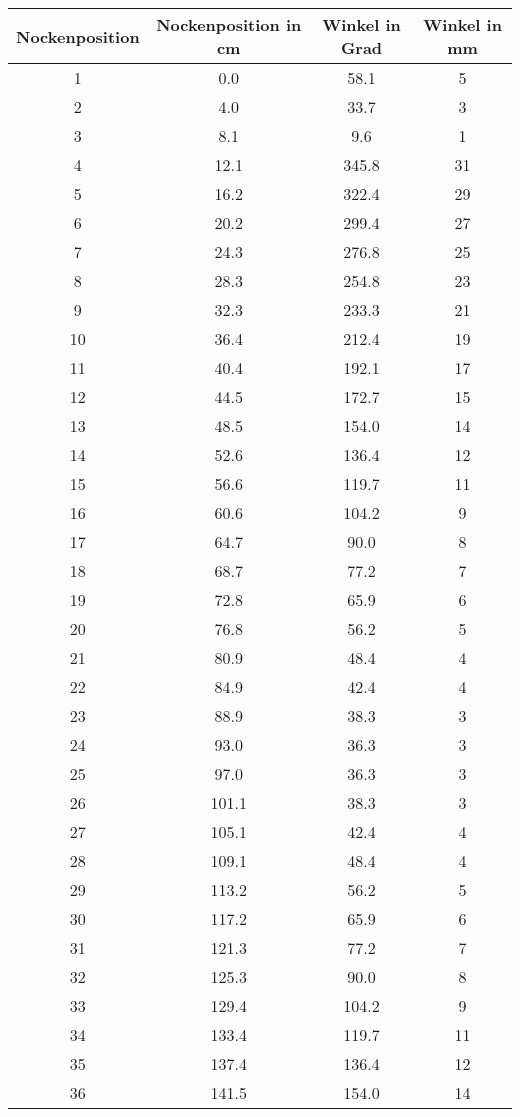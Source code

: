 \documentclass[10pt, a4paper]{article}
\begin{document}
\begin{center}
	\begin{tabular}{c|c|c|c}
		Nockenposition & Nockenposition in cm & Winkel in Grad & Winkel in mm \\
		\hline
		1 & 0.0 & 58.1 & 5 \\
		2 & 4.0 & 33.7 & 3 \\
		3 & 8.1 & 9.6 & 1 \\
		4 & 12.1 & 345.8 & 31 \\
		5 & 16.2 & 322.4 & 29 \\
		6 & 20.2 & 299.4 & 27 \\
		7 & 24.3 & 276.8 & 25 \\
		8 & 28.3 & 254.8 & 23 \\
		9 & 32.3 & 233.3 & 21 \\
		10 & 36.4 & 212.4 & 19 \\
		11 & 40.4 & 192.1 & 17 \\
		12 & 44.5 & 172.7 & 15 \\
		13 & 48.5 & 154.0 & 14 \\
		14 & 52.6 & 136.4 & 12 \\
		15 & 56.6 & 119.7 & 11 \\
		16 & 60.6 & 104.2 & 9 \\
		17 & 64.7 & 90.0 & 8 \\
		18 & 68.7 & 77.2 & 7 \\
		19 & 72.8 & 65.9 & 6 \\
		20 & 76.8 & 56.2 & 5 \\
		21 & 80.9 & 48.4 & 4 \\
		22 & 84.9 & 42.4 & 4 \\
		23 & 88.9 & 38.3 & 3 \\
		24 & 93.0 & 36.3 & 3 \\
		25 & 97.0 & 36.3 & 3 \\
		26 & 101.1 & 38.3 & 3 \\
		27 & 105.1 & 42.4 & 4 \\
		28 & 109.1 & 48.4 & 4 \\
		29 & 113.2 & 56.2 & 5 \\
		30 & 117.2 & 65.9 & 6 \\
		31 & 121.3 & 77.2 & 7 \\
		32 & 125.3 & 90.0 & 8 \\
		33 & 129.4 & 104.2 & 9 \\
		34 & 133.4 & 119.7 & 11 \\
		35 & 137.4 & 136.4 & 12 \\
		36 & 141.5 & 154.0 & 14 \\

\end{tabular}
\end{center}
\end{document}
